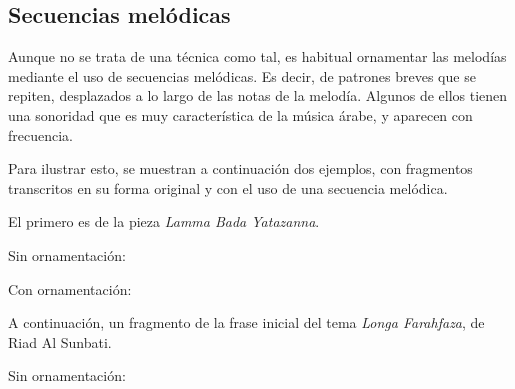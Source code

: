 \label{secuenciasmelodicasvocabulario}
\subsection{Secuencias melódicas}

Aunque no se trata de una técnica como tal, es habitual ornamentar las melodías mediante el uso de secuencias melódicas. Es decir, de patrones breves que se repiten, desplazados a lo largo de las notas de la melodía. Algunos de ellos tienen una sonoridad que es muy característica de la música árabe, y aparecen con frecuencia.

Para ilustrar esto, se muestran a continuación dos ejemplos, con fragmentos transcritos en su forma original y con el uso de una secuencia melódica.

El primero es de la pieza \emph{Lamma Bada Yatazanna}.

Sin ornamentación:


\begin{center}
\end{center}


Con ornamentación:


\begin{center}
\end{center}



A continuación, un fragmento de la frase inicial del tema \emph{Longa Farahfaza}, de Riad Al Sunbati.

Sin ornamentación:


\begin{center}
\end{center}


